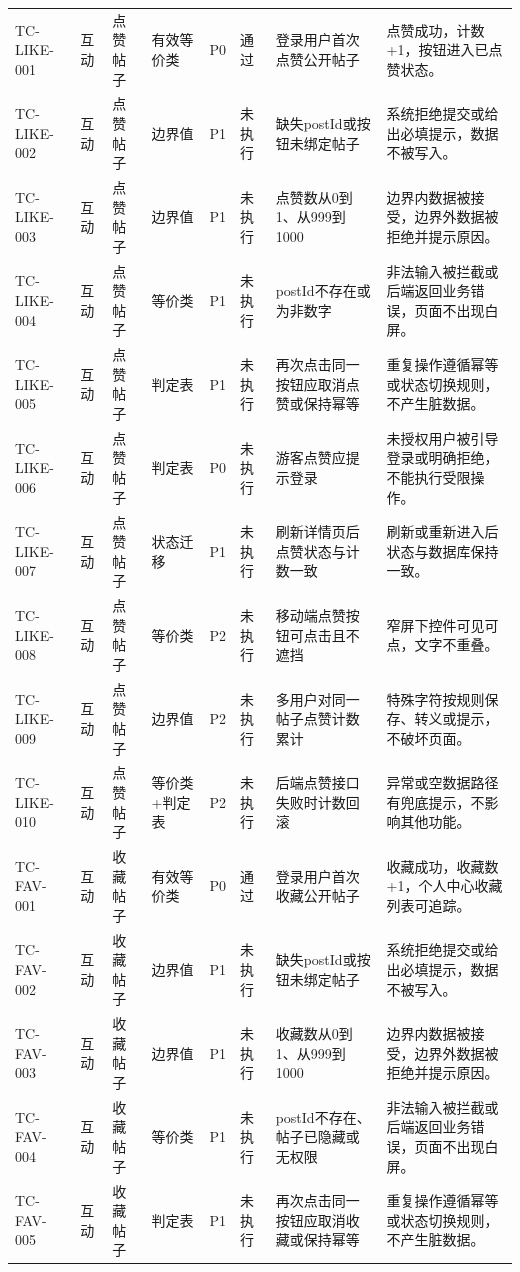 \documentclass[UTF8,zihao=-4]{ctexart}
\begin{document}
{\begin{longtable}{P{1.8cm}P{1.7cm}P{2.2cm}P{1.8cm}P{1cm}P{1.2cm}P{4.1cm}P{5.3cm}}
TC-LIKE-001 & 互动 & 点赞帖子 & 有效等价类 & P0 & 通过 & 登录用户首次点赞公开帖子 & 点赞成功，计数+1，按钮进入已点赞状态。 \\
TC-LIKE-002 & 互动 & 点赞帖子 & 边界值 & P1 & 未执行 & 缺失postId或按钮未绑定帖子 & 系统拒绝提交或给出必填提示，数据不被写入。 \\
TC-LIKE-003 & 互动 & 点赞帖子 & 边界值 & P1 & 未执行 & 点赞数从0到1、从999到1000 & 边界内数据被接受，边界外数据被拒绝并提示原因。 \\
TC-LIKE-004 & 互动 & 点赞帖子 & 等价类 & P1 & 未执行 & postId不存在或为非数字 & 非法输入被拦截或后端返回业务错误，页面不出现白屏。 \\
TC-LIKE-005 & 互动 & 点赞帖子 & 判定表 & P1 & 未执行 & 再次点击同一按钮应取消点赞或保持幂等 & 重复操作遵循幂等或状态切换规则，不产生脏数据。 \\
TC-LIKE-006 & 互动 & 点赞帖子 & 判定表 & P0 & 未执行 & 游客点赞应提示登录 & 未授权用户被引导登录或明确拒绝，不能执行受限操作。 \\
TC-LIKE-007 & 互动 & 点赞帖子 & 状态迁移 & P1 & 未执行 & 刷新详情页后点赞状态与计数一致 & 刷新或重新进入后状态与数据库保持一致。 \\
TC-LIKE-008 & 互动 & 点赞帖子 & 等价类 & P2 & 未执行 & 移动端点赞按钮可点击且不遮挡 & 窄屏下控件可见可点，文字不重叠。 \\
TC-LIKE-009 & 互动 & 点赞帖子 & 边界值 & P2 & 未执行 & 多用户对同一帖子点赞计数累计 & 特殊字符按规则保存、转义或提示，不破坏页面。 \\
TC-LIKE-010 & 互动 & 点赞帖子 & 等价类+判定表 & P2 & 未执行 & 后端点赞接口失败时计数回滚 & 异常或空数据路径有兜底提示，不影响其他功能。 \\
TC-FAV-001 & 互动 & 收藏帖子 & 有效等价类 & P0 & 通过 & 登录用户首次收藏公开帖子 & 收藏成功，收藏数+1，个人中心收藏列表可追踪。 \\
TC-FAV-002 & 互动 & 收藏帖子 & 边界值 & P1 & 未执行 & 缺失postId或按钮未绑定帖子 & 系统拒绝提交或给出必填提示，数据不被写入。 \\
TC-FAV-003 & 互动 & 收藏帖子 & 边界值 & P1 & 未执行 & 收藏数从0到1、从999到1000 & 边界内数据被接受，边界外数据被拒绝并提示原因。 \\
TC-FAV-004 & 互动 & 收藏帖子 & 等价类 & P1 & 未执行 & postId不存在、帖子已隐藏或无权限 & 非法输入被拦截或后端返回业务错误，页面不出现白屏。 \\
TC-FAV-005 & 互动 & 收藏帖子 & 判定表 & P1 & 未执行 & 再次点击同一按钮应取消收藏或保持幂等 & 重复操作遵循幂等或状态切换规则，不产生脏数据。 \\

\end{longtable}}
\end{document}
